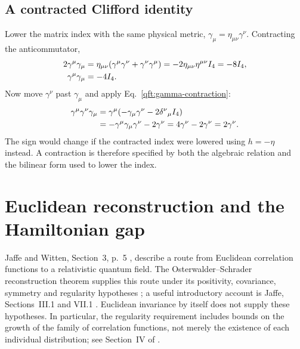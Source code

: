 \subsection{A contracted Clifford identity}
Lower the matrix index with the same physical metric,
$\gamma_\mu=\eta_{\mu\nu}\gamma^\nu$. Contracting the anticommutator,
\begin{align}
 2\gamma^\mu\gamma_\mu
 &=\eta_{\mu\nu}(\gamma^\mu\gamma^\nu+\gamma^\nu\gamma^\mu)
 =-2\eta_{\mu\nu}\eta^{\mu\nu}I_4=-8I_4,\notag\\
 \gamma^\mu\gamma_\mu&=-4I_4.
 \label{qft:gamma-contraction}
\end{align}
Now move $\gamma^\nu$ past $\gamma_\mu$ and apply
Eq.~\eqref{qft:gamma-contraction}:
\begin{align}
 \gamma^\mu\gamma^\nu\gamma_\mu
 &=\gamma^\mu(-\gamma_\mu\gamma^\nu-2\delta^\nu{}_\mu I_4)\notag\\
 &=-\gamma^\mu\gamma_\mu\gamma^\nu-2\gamma^\nu
 =4\gamma^\nu-2\gamma^\nu=2\gamma^\nu.
 \label{qft:gamma-sandwich}
\end{align}
The sign would change if the contracted index were lowered using $h=-\eta$
instead. A contraction is therefore specified by both the algebraic
relation and the bilinear form used to lower the index.

\section{Euclidean reconstruction and the Hamiltonian gap}
\label{qft:sec:euclidean-reconstruction}
Jaffe and Witten, Section~3, p.~5 \cite{JaffeWitten2006}, describe a route
from Euclidean correlation functions to a relativistic quantum field.
The Osterwalder--Schrader reconstruction theorem supplies this route under
its positivity, covariance, symmetry and regularity hypotheses
\cite{OsterwalderSchrader1975}; a useful introductory account is
Jaffe, Sections~III.1 and VII.1 \cite{Jaffe2007Relativity}.
Euclidean invariance by itself does not supply these hypotheses.
In particular, the regularity requirement includes bounds on the growth
of the family of correlation functions, not merely the existence of each
individual distribution; see Section~IV of \cite{OsterwalderSchrader1975}.

